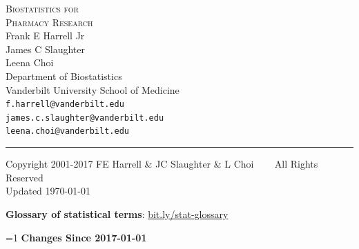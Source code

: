 \documentclass{report}
\begin{document}
\else %

\begin{flushright}
\Huge
\textsc{Biostatistics for\\Pharmacy Research}\\[2ex]
\huge Frank E Harrell Jr \\ James C Slaughter \\ Leena Choi \\
\Large
Department of Biostatistics \\
Vanderbilt University School of Medicine \\
\texttt{f.harrell@vanderbilt.edu} \\ \texttt{james.c.slaughter@vanderbilt.edu} \\ \texttt{leena.choi@vanderbilt.edu} 
\small
\end{flushright}
\rule{\linewidth}{1mm}
\begin{center}
\vspace{.5in}
\small
Copyright 2001-2017 FE Harrell \& JC Slaughter \& L Choi ~~~ All Rights Reserved
\\ \hfill \scriptsize Updated \today
\end{center}
\fi

\thispagestyle{empty}
\pagestyle{headings}

\setcounter{tocdepth}{1}
{\smaller \textbf{Glossary of statistical terms}: \url{bit.ly/stat-glossary}}


\tableofcontents

\def\changeHistoryShow{1}     %
\ifnum\changeHistoryShow=1
\bigskip
\need 3.5in
\textbf{Changes Since 2017-01-01}
\end{document}
